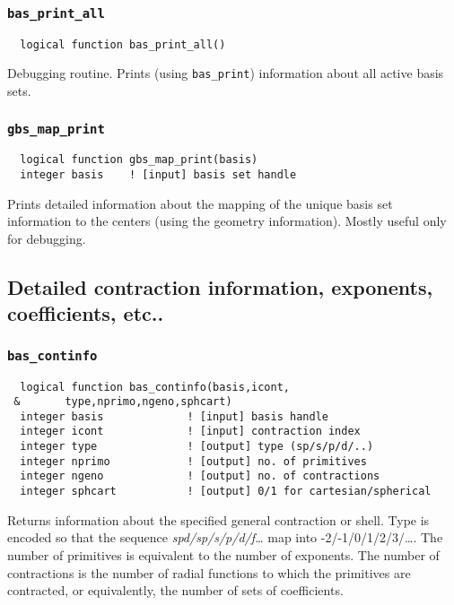 \subsubsection{{\tt bas\_print\_all}}
\begin{verbatim}
  logical function bas_print_all()
\end{verbatim}
Debugging routine.  Prints (using \verb+bas_print+) information about
all active basis sets.

\subsubsection{{\tt gbs\_map\_print}}
\begin{verbatim}
  logical function gbs_map_print(basis)
  integer basis    ! [input] basis set handle
\end{verbatim}
Prints detailed information about the mapping of the unique basis set
information to the centers (using the geometry information).  Mostly
useful only for debugging.


\subsection{Detailed contraction information, exponents, coefficients,
  etc..} 

\subsubsection{{\tt bas\_continfo}}
\begin{verbatim}
  logical function bas_continfo(basis,icont,
 &       type,nprimo,ngeno,sphcart)
  integer basis             ! [input] basis handle
  integer icont             ! [input] contraction index
  integer type              ! [output] type (sp/s/p/d/..)
  integer nprimo            ! [output] no. of primitives
  integer ngeno             ! [output] no. of contractions
  integer sphcart           ! [output] 0/1 for cartesian/spherical
\end{verbatim}
Returns information about the specified general contraction or shell.
Type is encoded so that the sequence {\em spd/sp/s/p/d/f\ldots} map
into -2/-1/0/1/2/3/\ldots.  The number of primitives is equivalent to
the number of exponents.  The number of contractions is the number of
radial functions to which the primitives are contracted, or equivalently,
the number of sets of coefficients.

